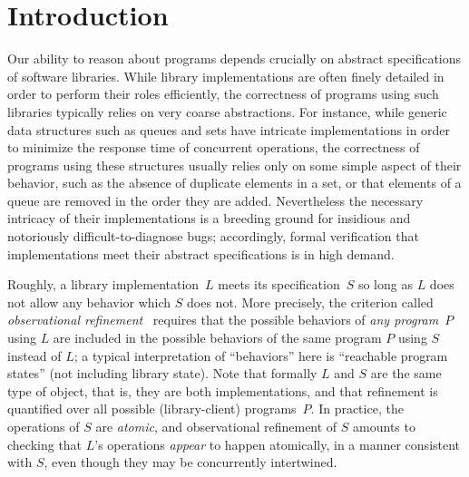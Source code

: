 
\section{Introduction}
\label{sec:intro}

Our ability to reason about programs depends crucially on abstract
specifications of software libraries. While library implementations are often
finely detailed in order to perform their roles efficiently, the correctness of
programs using such libraries typically relies on very coarse abstractions. For
instance, while generic data structures such as queues and sets have intricate
implementations in order to minimize the response time of concurrent
operations, the correctness of programs using these structures usually relies
only on some simple aspect of their behavior, such as the absence of duplicate
elements in a set, or that elements of a queue are removed in the order they
are added. Nevertheless the necessary intricacy of their implementations is a
breeding ground for insidious and notoriously difficult-to-diagnose bugs;
accordingly, formal verification that implementations meet their abstract
specifications is in high demand.

Roughly, a library implementation~$L$ meets its specification~$S$ so long as
$L$ does not allow any behavior which $S$ does not. More precisely, the
criterion called \emph{observational refinement}~\citep{ conf/esop/HeHS86,
journals/ipl/HoareHS87, journals/tcs/Plotkin77} requires that the possible
behaviors of \emph{any program~$P$} using $L$ are included in the possible
behaviors of the same program $P$ using $S$ instead of $L$; a typical
interpretation of ``behaviors'' here is ``reachable program states'' (not
including library state). Note that formally $L$ and $S$ are the same type of
object, that is, they are both implementations, and that refinement is
quantified over all possible (library-client) programs~$P$. In practice, the
operations of $S$ are \emph{atomic}, and observational refinement of $S$
amounts to checking that $L$'s operations \emph{appear} to happen atomically,
in a manner consistent with $S$, even though they may be concurrently
intertwined.

